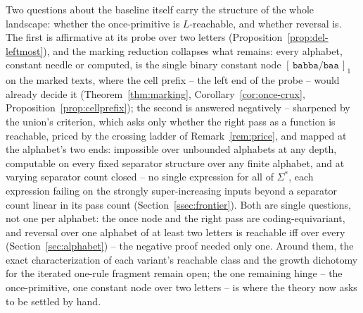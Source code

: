 \documentclass[runningheads,envcountsect]{llncs}
\begin{document}
Two questions about the baseline itself carry the structure of the whole landscape: whether the once-primitive is $L$-reachable, and whether reversal is. The first is affirmative at its probe over two letters (Proposition~\ref{prop:del-leftmost}), and the marking reduction collapses what remains: every alphabet, constant needle or computed, is the single binary constant node $[\,\mathtt{babba}/\mathtt{baa}\,]_1$ on the marked texts, where the cell prefix -- the left end of the probe -- would already decide it (Theorem~\ref{thm:marking}, Corollary~\ref{cor:once-crux}, Proposition~\ref{prop:cellprefix}); the second is answered negatively -- sharpened by the union's criterion, which asks only whether the right pass as a function is reachable, priced by the crossing ladder of Remark~\ref{rem:price}, and mapped at the alphabet's two ends: impossible over unbounded alphabets at any depth, computable on every fixed separator structure over any finite alphabet, and at varying separator count closed -- no single expression for all of $\Sigma^*$, each expression failing on the strongly super-increasing inputs beyond a separator count linear in its pass count (Section~\ref{ssec:frontier}). Both are single questions, not one per alphabet: the once node and the right pass are coding-equivariant, and reversal over one alphabet of at least two letters is reachable iff over every (Section~\ref{sec:alphabet}) -- the negative proof needed only one. Around them, the exact characterization of each variant's reachable class and the growth dichotomy for the iterated one-rule fragment remain open; the one remaining hinge -- the once-primitive, one constant node over two letters -- is where the theory now asks to be settled by hand.



\end{document}
